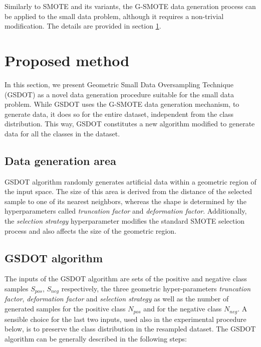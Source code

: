 Similarly to SMOTE and its variants, the G-SMOTE data generation process can be applied to the small data problem, although it requires a non-trivial modification. The details are provided in section \ref{proposed}.

\section{Proposed method}
\label{proposed}

In this section, we present Geometric Small Data Oversampling Technique (GSDOT) as a novel data generation procedure suitable for the small data problem. While GSDOT uses the G-SMOTE data generation mechanism, to generate data, it does so for the entire dataset, independent from the class distribution. This way, GSDOT constitutes a new algorithm modified to generate data for all the classes in the dataset.

\subsection{Data generation area}

GSDOT algorithm randomly generates artificial data within a geometric region of the input space. The size of this area is derived from the distance of the selected sample to one of its nearest neighbors, whereas the shape is determined by the hyperparameters called \textit{truncation factor} and \textit{deformation factor}. Additionally, the \textit{selection strategy} hyperparameter modifies the standard SMOTE selection process and also affects the size of the geometric region.

\subsection{GSDOT algorithm}
\label{algorithm}

The inputs of the GSDOT algorithm are sets of the positive and negative class samples \( S_{pos} \), \( S_{neg} \) respectively, the three geometric hyper-parameters \textit{truncation factor}, \textit{deformation factor} and \textit{selection strategy} as well as the number of generated samples for the positive class \(N_{pos} \) and for the negative class \( N_{neg} \). A sensible choice for the last two inputs, used also in the experimental procedure below, is to preserve the class distribution in the resampled dataset. The GSDOT algorithm can be generally described in the following steps:

